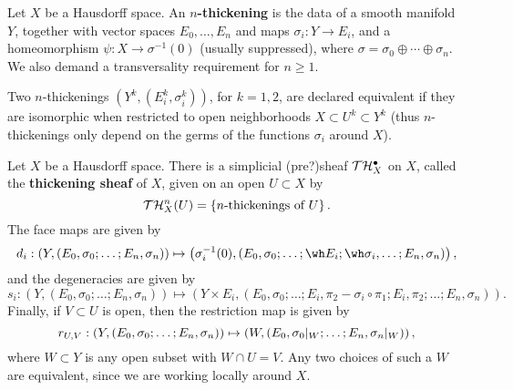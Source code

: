 \begin{defn}\label{n-thickening}
Let $X$ be a Hausdorff space. An {\bf $n$-thickening} is the data of a smooth manifold $Y$, together with vector spaces $E_0, \dots, E_n$  and maps $\sigma_i: Y \to E_i$, and a homeomorphism $\psi: X \to \sigma^{-1}(0)$ (usually suppressed), where $\sigma = \sigma_0 \oplus \cdots \oplus \sigma_n$. We also demand a transversality requirement for $n \geq 1$. 

Two $n$-thickenings $(Y^k, (E_i^k, \sigma_i^k))$, for $k = 1, 2$, are declared equivalent if they are isomorphic when restricted to open neighborhoods $X \subset U^k \subset Y^k$ (thus $n$-thickenings only depend on the germs of the functions $\sigma_i$ around $X$).
\end{defn}


Let $X$ be a Hausdorff space. There is a simplicial (pre?)sheaf $\mathcal T \mathcal H_X^\bullet$ on $X$, called the {\bf thickening sheaf} of $X$, given on an open $U \subset X$ by
\[ \mathcal T \mathcal H_X^n(U) = \left\{ \text{$n$-thickenings of $U$} \right\}. \]
The face maps are given by
\[ d_i : \left( Y, (E_0, \sigma_0; \dots; E_n, \sigma_n) \right) \mapsto \left( \sigma_i^{-1}(0), (E_0, \sigma_0; \dots; \wh E_i; \wh \sigma_i, \dots ; E_n, \sigma_n) \right), \]
and the degeneracies are given by
\[ s_i : \left( Y, (E_0, \sigma_0; \dots; E_n, \sigma_n) \right) \mapsto \left( Y \times E_i, (E_0, \sigma_0; \dots; E_i, \pi_2 - \sigma_i \circ \pi_1; E_i, \pi_2; \dots; E_n, \sigma_n) \right). \]
Finally, if $V \subset U$ is open, then the restriction map is given by
\[ r_{U, V}: \left( Y, (E_0, \sigma_0; \dots; E_n, \sigma_n) \right) \mapsto \left( W, (E_0, {\sigma_0|_{W}}; \dots; E_n, {\sigma_n|_{W}}) \right), \]
where $W \subset Y$ is any open subset with $W \cap U = V$. Any two choices of such a $W$ are equivalent, since we are working locally around $X$.

